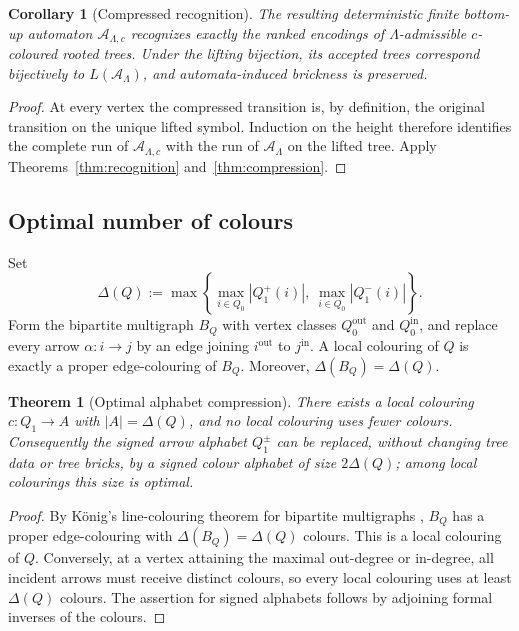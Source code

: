 \documentclass[11pt,a4paper]{amsart}
\theoremstyle{definition}
\theoremstyle{plain}
\newtheorem{theorem}[definition]{Theorem}
\newtheorem{corollary}[definition]{Corollary}
\theoremstyle{remark}
\numberwithin{equation}{section}
\begin{document}
\begin{corollary}[Compressed recognition]\label{cor:compressed-recognition}
The resulting deterministic finite bottom-up automaton $\mathcal A_{\Lambda,c}$ recognizes exactly the ranked encodings of $\Lambda$-admissible $c$-coloured rooted trees. Under the lifting bijection, its accepted trees correspond bijectively to $L(\mathcal A_\Lambda)$, and automata-induced brickness is preserved.
\end{corollary}

\begin{proof}
At every vertex the compressed transition is, by definition, the original transition on the unique lifted symbol. Induction on the height therefore identifies the complete run of $\mathcal A_{\Lambda,c}$ with the run of $\mathcal A_\Lambda$ on the lifted tree. Apply Theorems~\ref{thm:recognition} and~\ref{thm:compression}.
\end{proof}

\subsection{Optimal number of colours}

Set
\[
\Delta(Q):=\max\left\{\max_{i\in Q_0}|Q_1^+(i)|,\ \max_{i\in Q_0}|Q_1^-(i)|\right\}.
\]
Form the bipartite multigraph $B_Q$ with vertex classes $Q_0^{\mathrm{out}}$ and $Q_0^{\mathrm{in}}$, and replace every arrow $\alpha:i\to j$ by an edge joining $i^{\mathrm{out}}$ to $j^{\mathrm{in}}$. A local colouring of $Q$ is exactly a proper edge-colouring of $B_Q$. Moreover, $\Delta(B_Q)=\Delta(Q)$.

\begin{theorem}[Optimal alphabet compression]\label{thm:optimal-colouring}
There exists a local colouring $c:Q_1\to A$ with $|A|=\Delta(Q)$, and no local colouring uses fewer colours. Consequently the signed arrow alphabet $Q_1^{\pm}$ can be replaced, without changing tree data or tree bricks, by a signed colour alphabet of size $2\Delta(Q)$; among local colourings this size is optimal.
\end{theorem}

\begin{proof}
By K\"onig's line-colouring theorem for bipartite multigraphs \cite[Theorem~1.4.18]{LovaszPlummer}, $B_Q$ has a proper edge-colouring with $\Delta(B_Q)=\Delta(Q)$ colours. This is a local colouring of $Q$. Conversely, at a vertex attaining the maximal out-degree or in-degree, all incident arrows must receive distinct colours, so every local colouring uses at least $\Delta(Q)$ colours. The assertion for signed alphabets follows by adjoining formal inverses of the colours.
\end{proof}
\end{document}
